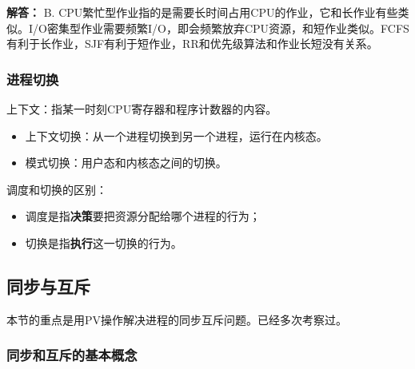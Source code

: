 \documentclass[12pt, a4paper, oneside]{ctexart}
\newenvironment{solution}{\begin{shaded}\par\noindent\textbf{解答：}}{\end{shaded}\par}
\begin{document}
\begin{solution}
  B. CPU繁忙型作业指的是需要长时间占用CPU的作业，它和长作业有些类似。I/O密集型作业需要频繁I/O，即会频繁放弃CPU资源，和短作业类似。FCFS有利于长作业，SJF有利于短作业，RR和优先级算法和作业长短没有关系。
\end{solution}

\subsubsection{进程切换}

上下文：指某一时刻CPU寄存器和程序计数器的内容。

\begin{itemize}
  \item 上下文切换：从一个进程切换到另一个进程，运行在内核态。
  \item 模式切换：用户态和内核态之间的切换。
\end{itemize}

调度和切换的区别：
\begin{itemize}
  \item 调度是指\textbf{决策}要把资源分配给哪个进程的行为；
  \item 切换是指\textbf{执行}这一切换的行为。
\end{itemize}

\subsection{同步与互斥}

本节的重点是用PV操作解决进程的同步互斥问题。已经多次考察过。

\subsubsection{同步和互斥的基本概念}
\end{document}
